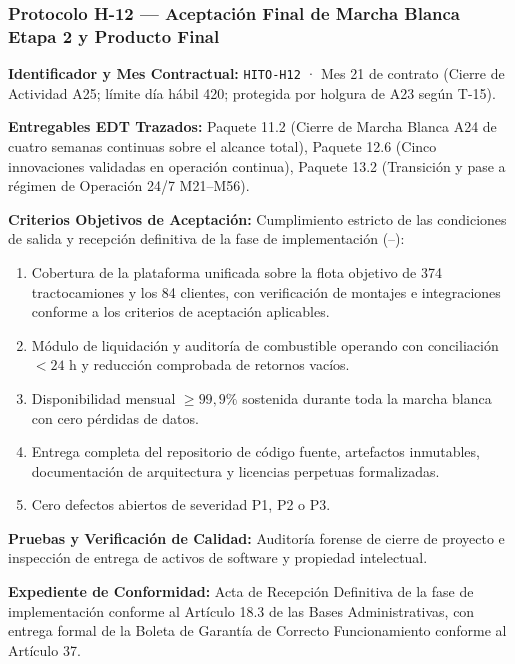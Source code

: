\subsubsection*{Protocolo H-12 — Aceptación Final de Marcha Blanca Etapa 2 y Producto Final}\label{sec:9-proto-h12}
\par\noindent\textbf{Identificador y Mes Contractual:} \texttt{HITO-H12} · Mes 21 de contrato (Cierre de Actividad A25; límite día hábil 420; protegida por holgura de A23 según T-15).\par
\par\noindent\textbf{Entregables EDT Trazados:} Paquete 11.2 (Cierre de Marcha Blanca A24 de cuatro semanas continuas sobre el alcance total), Paquete 12.6 (Cinco innovaciones validadas en operación continua), Paquete 13.2 (Transición y pase a régimen de Operación 24/7 M21--M56).\par
\par\noindent\textbf{Criterios Objetivos de Aceptación:} Cumplimiento estricto de las condiciones de salida y recepción definitiva de la fase de implementación (--):
\begin{enumerate}
  \item Cobertura de la plataforma unificada sobre la flota objetivo de 374 tractocamiones y los 84 clientes, con verificación de montajes e integraciones conforme a los criterios de aceptación aplicables.
  \item Módulo de liquidación y auditoría de combustible operando con conciliación $< 24\text{ h}$ y reducción comprobada de retornos vacíos.
  \item Disponibilidad mensual $\ge 99,9\%$ sostenida durante toda la marcha blanca con cero pérdidas de datos.
  \item Entrega completa del repositorio de código fuente, artefactos inmutables, documentación de arquitectura y licencias perpetuas formalizadas.
  \item Cero defectos abiertos de severidad P1, P2 o P3.
\end{enumerate}
\par\noindent\textbf{Pruebas y Verificación de Calidad:} Auditoría forense de cierre de proyecto e inspección de entrega de activos de software y propiedad intelectual.\par
\par\noindent\textbf{Expediente de Conformidad:} Acta de Recepción Definitiva de la fase de implementación conforme al Artículo 18.3 de las Bases Administrativas, con entrega formal de la Boleta de Garantía de Correcto Funcionamiento conforme al Artículo 37.\par
